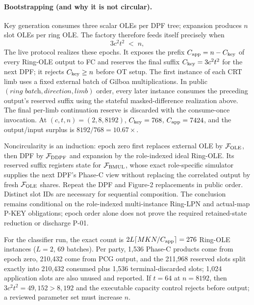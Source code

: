 \documentclass[11pt]{article}
\begin{document}
\paragraph{Bootstrapping (and why it is not circular).} Key generation
consumes three scalar OLEs per DPF tree; expansion produces $n$ slot OLEs per
ring OLE. The factory therefore feeds itself precisely when
\begin{equation}
3c^2 t^2 \;<\; n,
\label{eq:bootstrap}
\end{equation}
The live protocol realizes these epochs. It exposes the prefix
$C_{\rm app}=n-C_{\rm key}$ of every Ring-OLE output to FC and reserves the
final suffix
$C_{\rm key}=3c^2t^2$ for the next DPF; it rejects $C_{\rm key}\ge n$ before OT
setup. The first instance of each CRT limb uses a fixed external batch of
Gilboa multiplications. In public $(\textit{ring batch},\textit{direction},
\textit{limb})$ order, every later instance consumes the preceding output's
reserved suffix using the stateful masked-difference realization above. The final
per-limb continuation reserve is discarded with the consume-once invocation.
At $(c,t,n)=(2,8,8192)$, $C_{\rm key}=768$,
$C_{\rm app}=7424$, and the output/input surplus is
$8192/768=10.67\times$.

Noncircularity is an induction: epoch zero first replaces external OLE by
$\mathcal F_{\rm OLE}$, then DPF by $\mathcal F_{\rm DDPF}$ and expansion by
the role-indexed ideal Ring-OLE. Its reserved suffix registers state for
$\mathcal F_{\rm BMUL}$, whose exact role-specific simulator supplies the next
DPF's Phase-C view without replacing the correlated output by fresh
$\mathcal F_{\rm OLE}$ shares. Repeat the DPF and Figure-2 replacements in
public order. Distinct slot IDs are necessary for sequential composition.
The conclusion remains conditional on the role-indexed multi-instance
Ring-LPN and actual-map P-KEY obligations; epoch order alone does not prove
the required retained-state reduction or discharge P-01.

For the classifier run, the exact count is
$2L\lceil MKN/C_{\rm app}\rceil=276$ Ring-OLE instances
($L=2$, 69 batches). Per party, 1{,}536 Phase-C products come from epoch zero,
210{,}432 come from PCG output, and the 211{,}968 reserved slots split exactly
into 210{,}432 consumed plus 1{,}536 terminal-discarded slots; 1{,}024
application slots are also unused and reported. If $t=64$ at $n=8192$, then
$3c^2t^2=49{,}152>8{,}192$ and the executable capacity control rejects before
output; a reviewed parameter set must increase $n$.
\end{document}
